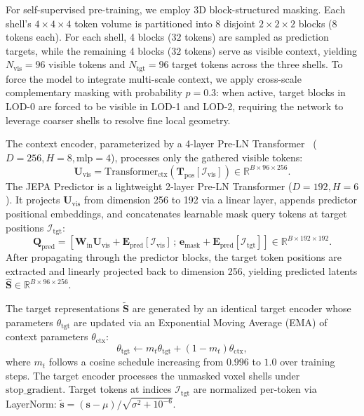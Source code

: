 \documentclass{svproc}
\begin{document}
For self-supervised pre-training, we employ 3D block-structured masking. Each shell's $4 \times 4 \times 4$ token volume is partitioned into 8 disjoint $2 \times 2 \times 2$ blocks ($8$ tokens each). For each shell, 4 blocks ($32$ tokens) are sampled as prediction targets, while the remaining 4 blocks ($32$ tokens) serve as visible context, yielding $N_{\text{vis}} = 96$ visible tokens and $N_{\text{tgt}} = 96$ target tokens across the three shells. To force the model to integrate multi-scale context, we apply cross-scale complementary masking with probability $p = 0.3$: when active, target blocks in LOD-0 are forced to be visible in LOD-1 and LOD-2, requiring the network to leverage coarser shells to resolve fine local geometry.

The context encoder, parameterized by a 4-layer Pre-LN Transformer~\cite{vaswani2017attention} ($D = 256, H = 8, \text{mlp} = 4$), processes only the gathered visible tokens:
\begin{equation}
\mathbf{U}_{\text{vis}} = \mathrm{Transformer}_{\text{ctx}}\left(\mathbf{T}_{\text{pos}}[\mathcal{I}_{\text{vis}}]\right) \in \mathbb{R}^{B \times 96 \times 256}.
\end{equation}
The JEPA Predictor is a lightweight 2-layer Pre-LN Transformer ($D = 192, H = 6$). It projects $\mathbf{U}_{\text{vis}}$ from dimension 256 to 192 via a linear layer, appends predictor positional embeddings, and concatenates learnable mask query tokens at target positions $\mathcal{I}_{\text{tgt}}$:
\begin{equation}
\mathbf{Q}_{\text{pred}} = \left[\mathbf{W}_{\text{in}}\mathbf{U}_{\text{vis}} + \mathbf{E}_{\text{pred}}[\mathcal{I}_{\text{vis}}]\,;\,\mathbf{e}_{\text{mask}} + \mathbf{E}_{\text{pred}}[\mathcal{I}_{\text{tgt}}]\right] \in \mathbb{R}^{B \times 192 \times 192}.
\end{equation}
After propagating through the predictor blocks, the target token positions are extracted and linearly projected back to dimension 256, yielding predicted latents $\hat{\mathbf{S}} \in \mathbb{R}^{B \times 96 \times 256}$.

The target representations $\tilde{\mathbf{S}}$ are generated by an identical target encoder whose parameters $\theta_{\text{tgt}}$ are updated via an Exponential Moving Average (EMA) of context parameters $\theta_{\text{ctx}}$:
\begin{equation}
\theta_{\text{tgt}} \leftarrow m_t \theta_{\text{tgt}} + (1 - m_t) \theta_{\text{ctx}},
\end{equation}
where $m_t$ follows a cosine schedule increasing from $0.996$ to $1.0$ over training steps. The target encoder processes the unmasked voxel shells under $\mathrm{stop\_gradient}$. Target tokens at indices $\mathcal{I}_{\text{tgt}}$ are normalized per-token via LayerNorm: $\tilde{\mathbf{s}} = (\mathbf{s} - \mu) / \sqrt{\sigma^2 + 10^{-6}}$.
\end{document}
